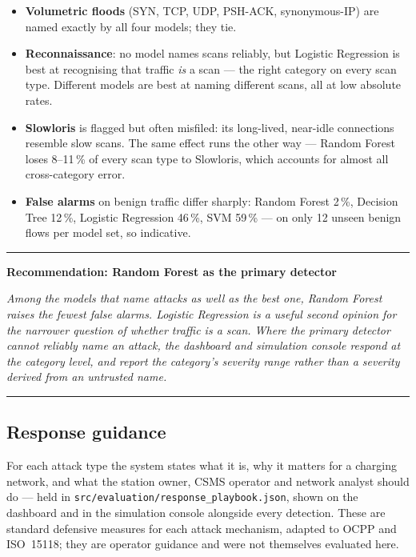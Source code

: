 \documentclass[11pt, a4paper]{article}
\newenvironment{tightitem}%
    {\begin{itemize}[leftmargin=1.4em, itemsep=0.3em]}{\end{itemize}}
\newenvironment{tightitem}{\begin{itemize}}{\end{itemize}}
\newenvironment{finding}[1]
    {\par\medskip\noindent\textcolor{primary}{\rule{\textwidth}{1pt}}\par\nobreak
     \smallskip\noindent\textbf{\textcolor{primary}{#1}}\par\nobreak\smallskip\itshape}
    {\par\smallskip\noindent\textcolor{primary}{\rule{\textwidth}{1pt}}\par\medskip}
\newcommand{\col}[1]{\texttt{\small #1}}
\begin{document}
\begin{tightitem}
  \item \textbf{Volumetric floods} (SYN, TCP, UDP, PSH-ACK, synonymous-IP) are
        named exactly by all four models; they tie.
  \item \textbf{Reconnaissance}: no model names scans reliably, but Logistic
        Regression is best at recognising that traffic \emph{is} a scan --- the
        right category on every scan type. Different models are best at naming
        different scans, all at low absolute rates.
  \item \textbf{Slowloris} is flagged but often misfiled: its long-lived,
        near-idle connections resemble slow scans. The same effect runs the
        other way --- Random Forest loses 8--11\,\% of every scan type to
        Slowloris, which accounts for almost all cross-category error.
  \item \textbf{False alarms} on benign traffic differ sharply: Random Forest
        2\,\%, Decision Tree 12\,\%, Logistic Regression 46\,\%, SVM 59\,\% --- on only
        12 unseen benign flows per model set, so indicative.
\end{tightitem}

\begin{finding}{Recommendation: Random Forest as the primary detector}
Among the models that name attacks as well as the best one, Random Forest
raises the fewest false alarms. Logistic Regression is a useful second opinion
for the narrower question of whether traffic is a scan. Where the primary
detector cannot reliably name an attack, the dashboard and simulation console
respond at the category level, and report the category's severity range rather
than a severity derived from an untrusted name.
\end{finding}

\subsection{Response guidance}

For each attack type the system states what it is, why it matters for a
charging network, and what the station owner, CSMS operator and network analyst
should do --- held in \col{src/evaluation/response\_playbook.json}, shown on the
dashboard and in the simulation console alongside every detection. These are
standard defensive measures for each attack mechanism, adapted to OCPP and
ISO~15118; they are operator guidance and were not themselves evaluated here.
\end{document}

